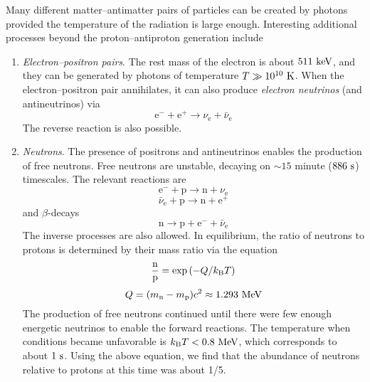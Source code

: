 \documentclass[]{article}
\begin{document}
Many different matter--antimatter pairs of particles can be created by 
photons provided the temperature of the radiation is large enough. 
Interesting additional processes beyond the proton--antiproton generation
include
\begin{enumerate}
\item {\it Electron--positron pairs}. The rest mass of the electron
is about $511~\mathrm{keV}$, and they can be generated by photons of temperature
$T\gg10^{10}~\mathrm{K}$. When the electron--positron pair annihilates, it can
also produce {\it electron neutrinos} (and antineutrinos) via
\begin{equation}
\mathrm{e}^{-} + \mathrm{e}^{+} \to \nu_{\mathrm{e}} + \bar{\nu}_{\mathrm{e}}
\end{equation}
\noindent
The reverse reaction is also possible.

\item {\it Neutrons}. The presence of positrons and antineutrinos enables the
production of free neutrons.  Free neutrons are unstable, decaying on 
$\sim15$ minute ($886~\mathrm{s}$) timescales. The relevant reactions are
\begin{equation}
\mathrm{e}^{-} + \mathrm{p} \to \mathrm{n} + \nu_{\mathrm{e}}
\end{equation}
\begin{equation}
\bar{\nu}_{\mathrm{e}} + \mathrm{p} \to \mathrm{n} + \mathrm{e}^{+}
\end{equation}
\noindent
and $\beta$-decays
\begin{equation}
\mathrm{n} \to \mathrm{p} + \mathrm{e}^{-} + \bar{\nu}_{\mathrm{e}}
\end{equation}
\noindent
The inverse processes are also allowed. In equilibrium, the ratio of
neutrons to protons is determined by their mass ratio via the equation
\begin{equation}
\frac{\mathrm{n}}{\mathrm{p}} = \exp\left(-Q/k_{\mathrm{B}} T\right)
\end{equation}
\begin{equation}
Q = (m_{\mathrm{n}} - m_{\mathrm{p}})c^2 \approx 1.293~\mathrm{MeV}
\end{equation}
\noindent
The production of free neutrons continued until there were few enough
energetic neutrinos to enable the forward reactions. The temperature when
conditions became unfavorable is $k_{\mathrm{B}} T< 0.8~\mathrm{MeV}$, which corresponds to
about $1~\mathrm{s}$. Using the above equation, we find that the abundance of
neutrons relative to protons at this time was about 1/5.
\end{enumerate}
\end{document}
